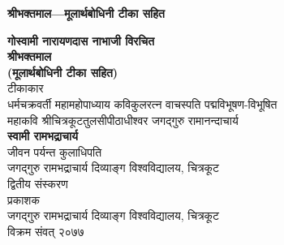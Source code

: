 \documentclass[twoside]{book}
\begin{document}
\begin{titlepage}
\thispagestyle{empty}
\begin{center}
\vspace*{4mm}
{\fontsize{20}{24}\selectfont \textbf{श्रीभक्तमाल—मूलार्थबोधिनी टीका सहित}}\\
\end{center}
\cleardoublepage
\thispagestyle{empty}
\begin{center}
\vspace*{4.5mm}
{\fontsize{26}{39}\selectfont \textbf{गोस्वामी नारायणदास नाभाजी विरचित}}\\
\vspace*{3mm}
{\fontsize{36}{54}\selectfont \textbf{श्रीभक्तमाल}}\\
\vspace*{4.5mm}
{\fontsize{28}{42}\selectfont \textbf{(मूलार्थबोधिनी टीका सहित)}}\\
\vfill
{\fontsize{18}{27}\selectfont टीकाकार}\\
\vspace*{2.5mm}
{\fontsize{18}{27}\selectfont धर्मचक्रवर्ती महामहोपाध्याय कविकुलरत्न वाचस्पति पद्मविभूषण-विभूषित}\\
\vspace*{1mm}
{\fontsize{18}{27}\selectfont महाकवि श्रीचित्रकूटतुलसीपीठाधीश्वर जगद्गुरु रामानन्दाचार्य}\\
\vspace*{1mm}
{\fontsize{26}{39}\selectfont \textbf{स्वामी रामभद्राचार्य}}\\
\vspace*{2.5mm}
{\fontsize{16}{22}\selectfont जीवन पर्यन्त कुलाधिपति}\\
\vspace*{1mm}
{\fontsize{16}{22}\selectfont जगद्गुरु रामभद्राचार्य दिव्याङ्ग विश्वविद्यालय, चित्रकूट}\\
\vfill
{\fontsize{16}{24}\selectfont द्वितीय संस्करण}\\
\vspace*{2.5mm}
\vfill
{\fontsize{16}{24}\selectfont प्रकाशक}\\
\vspace*{2.5mm}
{\fontsize{18}{27}\selectfont जगद्गुरु रामभद्राचार्य दिव्याङ्ग विश्वविद्यालय, चित्रकूट}\\
\vspace*{2.5mm}
{\fontsize{18}{27}\selectfont विक्रम संवत् २०७७}
\vspace*{4.5mm}
\end{center}
\pagebreak

\end{titlepage}
\end{document}
